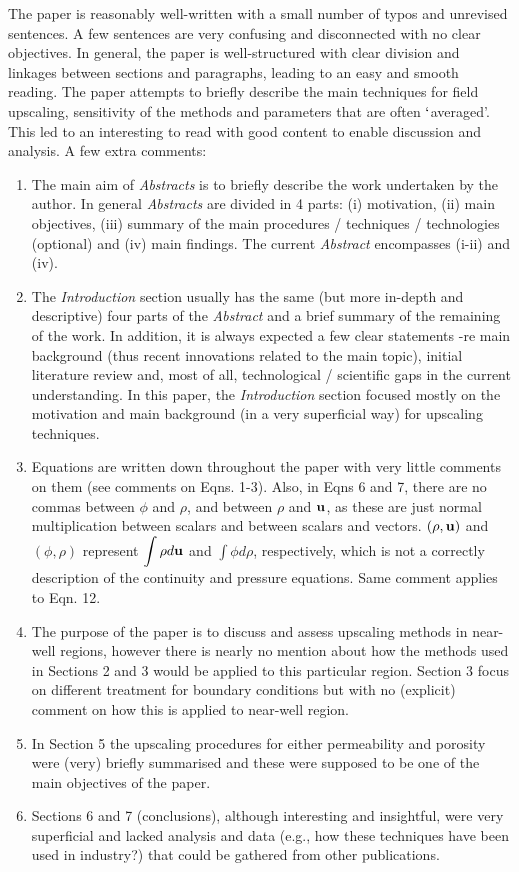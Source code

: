 \documentclass[14pt,twoside]{report}
\begin{document}
The paper is reasonably well-written with a small number of typos and unrevised sentences. A few sentences are very confusing and disconnected with no clear objectives. In general, the paper is well-structured with clear division and linkages between sections and paragraphs, leading to an easy and smooth reading. The paper attempts to briefly describe the main techniques for field upscaling, sensitivity of the methods and parameters that are often $\lq$averaged'. This led to an interesting to read with good content to enable discussion and analysis. A few extra comments:
\begin{enumerate}
\item The main aim of {\it Abstracts} is to briefly describe the work undertaken by the author. In general {\it Abstracts} are divided in 4 parts: (i) motivation, (ii) main objectives, (iii) summary of the main procedures / techniques / technologies (optional) and (iv) main findings. The current {\it Abstract} encompasses (i-ii) and (iv).
%
\item The {\it Introduction} section usually has the same (but more in-depth and descriptive) four parts of the {\it Abstract} and a brief summary of the remaining of the work. In addition, it is always expected a few clear statements -re main background (thus recent innovations related to the main topic), initial literature review and, most of all, technological / scientific gaps in the current understanding. In this paper, the {\it Introduction} section focused mostly on the motivation and main background (in a very superficial way) for upscaling techniques.
%
\item Equations are written down throughout the paper with very little comments on them (see comments on Eqns. 1-3). Also, in Eqns 6 and 7, there are no commas between $\phi$ and $\rho$, and between $\rho$ and ${\bf u}$, as these are just normal multiplication between scalars and between scalars and vectors. $\left(\rho,{\bf u}\right)$ and $\left(\phi,\rho\right)$ represent $\displaystyle\int\rho d{\bf u}$ and $\displaystyle\int \phi d\rho$, respectively, which is not a correctly description of the continuity and pressure equations.  Same comment applies to Eqn. 12.
%
\item The purpose of the paper is to discuss and assess upscaling methods in near-well regions, however there is nearly no mention about how the methods used in Sections 2 and 3 would be applied to this particular region. Section 3 focus on different treatment for boundary conditions but with no (explicit) comment on how this is applied to near-well region.
%
\item In Section 5 the upscaling procedures for either permeability and porosity were (very) briefly summarised and these were supposed to be one of the main objectives of the paper.  
%
\item Sections 6 and 7 (conclusions), although interesting and insightful, were very superficial and lacked analysis and data (e.g., how these techniques have been used in industry?) that could be gathered from other publications. 
\end{enumerate}
\end{document}

